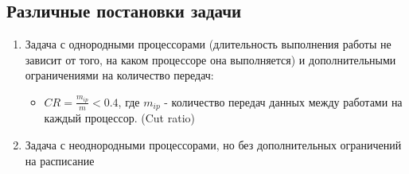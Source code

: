 \subsection{Различные постановки задачи} \label{sec:crit}
\begin{enumerate}
    \item Задача с однородными процессорами (длительность выполнения работы не зависит от того, на каком процессоре она выполняется) и дополнительными ограничениями на количество передач:
          \begin{itemize}
              \item $CR = \frac{m_{ip}}{m} < 0.4$, где $m_{ip}$ - количество передач данных между работами на каждый процессор. (Cut ratio)
          \end{itemize}
    \item Задача с неоднородными процессорами, но без дополнительных ограничений на расписание
\end{enumerate}
